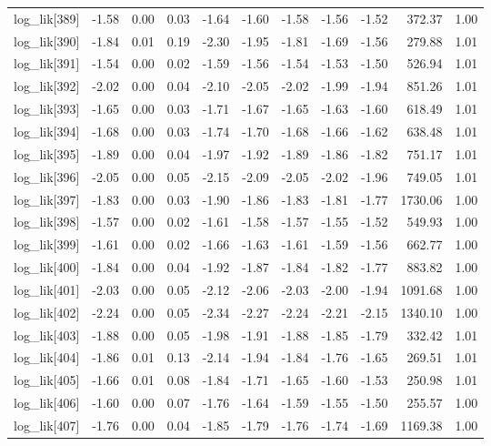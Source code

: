 \begin{table}[ht]
\begin{tabular}{rrrrrrrrrrr}
  log\_lik[389] & -1.58 & 0.00 & 0.03 & -1.64 & -1.60 & -1.58 & -1.56 & -1.52 & 372.37 & 1.00 \\ 
  log\_lik[390] & -1.84 & 0.01 & 0.19 & -2.30 & -1.95 & -1.81 & -1.69 & -1.56 & 279.88 & 1.01 \\ 
  log\_lik[391] & -1.54 & 0.00 & 0.02 & -1.59 & -1.56 & -1.54 & -1.53 & -1.50 & 526.94 & 1.01 \\ 
  log\_lik[392] & -2.02 & 0.00 & 0.04 & -2.10 & -2.05 & -2.02 & -1.99 & -1.94 & 851.26 & 1.01 \\ 
  log\_lik[393] & -1.65 & 0.00 & 0.03 & -1.71 & -1.67 & -1.65 & -1.63 & -1.60 & 618.49 & 1.01 \\ 
  log\_lik[394] & -1.68 & 0.00 & 0.03 & -1.74 & -1.70 & -1.68 & -1.66 & -1.62 & 638.48 & 1.01 \\ 
  log\_lik[395] & -1.89 & 0.00 & 0.04 & -1.97 & -1.92 & -1.89 & -1.86 & -1.82 & 751.17 & 1.01 \\ 
  log\_lik[396] & -2.05 & 0.00 & 0.05 & -2.15 & -2.09 & -2.05 & -2.02 & -1.96 & 749.05 & 1.01 \\ 
  log\_lik[397] & -1.83 & 0.00 & 0.03 & -1.90 & -1.86 & -1.83 & -1.81 & -1.77 & 1730.06 & 1.00 \\ 
  log\_lik[398] & -1.57 & 0.00 & 0.02 & -1.61 & -1.58 & -1.57 & -1.55 & -1.52 & 549.93 & 1.00 \\ 
  log\_lik[399] & -1.61 & 0.00 & 0.02 & -1.66 & -1.63 & -1.61 & -1.59 & -1.56 & 662.77 & 1.00 \\ 
  log\_lik[400] & -1.84 & 0.00 & 0.04 & -1.92 & -1.87 & -1.84 & -1.82 & -1.77 & 883.82 & 1.00 \\ 
  log\_lik[401] & -2.03 & 0.00 & 0.05 & -2.12 & -2.06 & -2.03 & -2.00 & -1.94 & 1091.68 & 1.00 \\ 
  log\_lik[402] & -2.24 & 0.00 & 0.05 & -2.34 & -2.27 & -2.24 & -2.21 & -2.15 & 1340.10 & 1.00 \\ 
  log\_lik[403] & -1.88 & 0.00 & 0.05 & -1.98 & -1.91 & -1.88 & -1.85 & -1.79 & 332.42 & 1.01 \\ 
  log\_lik[404] & -1.86 & 0.01 & 0.13 & -2.14 & -1.94 & -1.84 & -1.76 & -1.65 & 269.51 & 1.01 \\ 
  log\_lik[405] & -1.66 & 0.01 & 0.08 & -1.84 & -1.71 & -1.65 & -1.60 & -1.53 & 250.98 & 1.01 \\ 
  log\_lik[406] & -1.60 & 0.00 & 0.07 & -1.76 & -1.64 & -1.59 & -1.55 & -1.50 & 255.57 & 1.00 \\ 
  log\_lik[407] & -1.76 & 0.00 & 0.04 & -1.85 & -1.79 & -1.76 & -1.74 & -1.69 & 1169.38 & 1.00 \\ 

\end{tabular}
\end{table}
